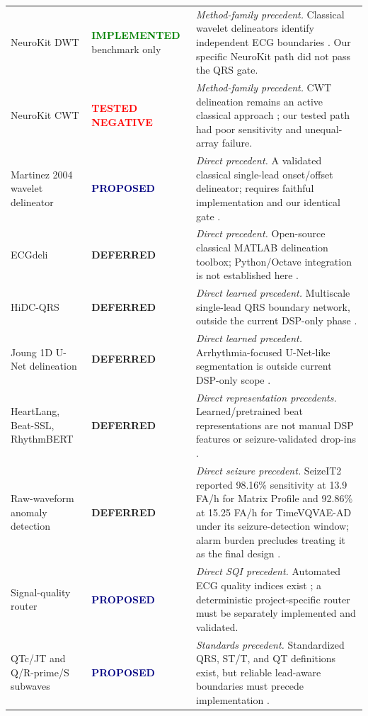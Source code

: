 \documentclass[11pt,a4paper]{article}
\newcommand{\implemented}{\textcolor{green}{\textbf{IMPLEMENTED}}}
\newcommand{\testednegative}{\textcolor{red}{\textbf{TESTED NEGATIVE}}}
\newcommand{\deferred}{\textcolor{amber}{\textbf{DEFERRED}}}
\newcommand{\proposed}{\textcolor{navy}{\textbf{PROPOSED}}}
\begin{document}
\begin{longtable}{p{}>{\small}p{}p{}}
NeuroKit DWT & \implemented{} benchmark only & \emph{Method-family precedent.} Classical wavelet delineators identify independent ECG boundaries \cite{martinez2004,dimarco2011}. Our specific NeuroKit path did not pass the QRS gate. \\
NeuroKit CWT & \testednegative & \emph{Method-family precedent.} CWT delineation remains an active classical approach \cite{platformcwt2025}; our tested path had poor sensitivity and unequal-array failure. \\
Martinez 2004 wavelet delineator & \proposed & \emph{Direct precedent.} A validated classical single-lead onset/offset delineator; requires faithful implementation and our identical gate \cite{martinez2004}. \\
ECGdeli & \deferred & \emph{Direct precedent.} Open-source classical MATLAB delineation toolbox; Python/Octave integration is not established here \cite{ecgdeli,ecgdelicode}. \\
HiDC-QRS & \deferred & \emph{Direct learned precedent.} Multiscale single-lead QRS boundary network, outside the current DSP-only phase \cite{hidc2026}. \\
Joung 1D U-Net delineation & \deferred & \emph{Direct learned precedent.} Arrhythmia-focused U-Net-like segmentation is outside current DSP-only scope \cite{joung2024}. \\
HeartLang, Beat-SSL, RhythmBERT & \deferred & \emph{Direct representation precedents.} Learned/pretrained beat representations are not manual DSP features or seizure-validated drop-ins \cite{heartlang,beatssl,rhythmbert}. \\
Raw-waveform anomaly detection & \deferred & \emph{Direct seizure precedent.} SeizeIT2 reported 98.16\% sensitivity at 13.9 FA/h for Matrix Profile and 92.86\% at 15.25 FA/h for TimeVQVAE-AD under its seizure-detection window; alarm burden precludes treating it as the final design \cite{seizeit22025}. \\
Signal-quality router & \proposed & \emph{Direct SQI precedent.} Automated ECG quality indices exist \cite{clifford2012}; a deterministic project-specific router must be separately implemented and validated. \\
QTc/JT and Q/R-prime/S subwaves & \proposed & \emph{Standards precedent.} Standardized QRS, ST/T, and QT definitions exist, but reliable lead-aware boundaries must precede implementation \cite{ahaqrs2009,ahaqt2009}. \\
\bottomrule
\end{longtable}
\end{document}
